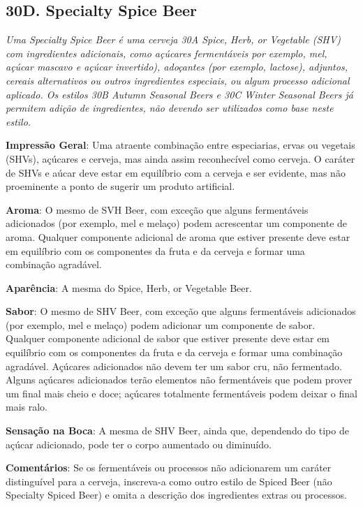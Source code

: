 \subsection*{30D. Specialty Spice Beer}
\textit{Uma Specialty Spice Beer é uma cerveja 30A Spice, Herb, or Vegetable (SHV) com ingredientes adicionais, como açúcares fermentáveis por exemplo, mel, açúcar mascavo e açúcar invertido), adoçantes (por exemplo, lactose), adjuntos, cereais alternativos ou outros ingredientes especiais, ou algum processo adicional aplicado. Os estilos 30B Autumn Seasonal Beers e 30C Winter Seasonal Beers já permitem adição de ingredientes, não devendo ser utilizados como base neste estilo.}

\textbf{Impressão Geral}: Uma atraente combinação entre especiarias, ervas ou vegetais (SHVs), açúcares e cerveja, mas ainda assim reconhecível como cerveja. O caráter de SHVs e aúcar deve estar em equilíbrio com a cerveja e ser evidente, mas não proeminente a ponto de sugerir um produto artificial.

\textbf{Aroma}: O mesmo de SVH Beer, com exceção que alguns fermentáveis adicionados (por exemplo, mel e melaço) podem acrescentar um componente de aroma. Qualquer componente adicional de aroma que estiver presente deve estar em equilíbrio com os componentes da fruta e da cerveja e formar uma combinação agradável.

\textbf{Aparência}: A mesma do Spice, Herb, or Vegetable Beer.

\textbf{Sabor}: O mesmo de SHV Beer, com exceção que alguns fermentáveis adicionados (por exemplo, mel e melaço) podem adicionar um componente de sabor. Qualquer componente adicional de sabor que estiver presente deve estar em equilíbrio com os componentes da fruta e da cerveja e formar uma combinação agradável. Açúcares adicionados não devem ter um sabor cru, não fermentado. Alguns açúcares adicionados terão elementos não fermentáveis que podem prover um final mais cheio e doce; açúcares totalmente fermentáveis podem deixar o final mais ralo.

\textbf{Sensação na Boca}: A mesma de SHV Beer, ainda que, dependendo do tipo de açúcar adicionado, pode ter o corpo aumentado ou diminuído.

\textbf{Comentários}: Se os fermentáveis ou processos não adicionarem um caráter distinguível para a cerveja, inscreva-a como outro estilo de Spiced Beer (não Specialty Spiced Beer) e omita a descrição dos ingredientes extras ou processos.

